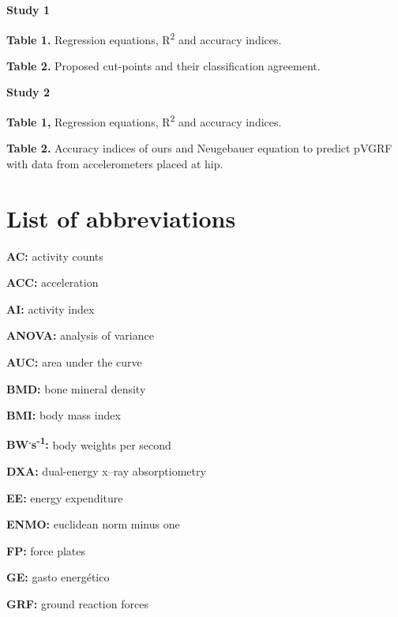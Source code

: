 \documentclass[12pt]{article}
\def\blankpage{%
      \clearpage%
      \thispagestyle{empty}%
      \addtocounter{page}{+0}%
      \null%
      \clearpage}
\begin{document}
\noindent \textbf{Study 1}
\vspace{0.5em}

\noindent \textbf{Table 1.} Regression equations, R\textsuperscript{2} and accuracy indices. 
\vspace{0.3em}

\noindent \textbf{Table 2.} Proposed cut-points and their classification agreement. 
\vspace{2em}

\noindent \textbf{Study 2}
\vspace{0.5em}

\noindent \textbf{Table 1,} Regression equations, R\textsuperscript{2} and accuracy indices. 
\vspace{0.3em}

\noindent \textbf{Table 2.} Accuracy indices of ours and Neugebauer equation to predict pVGRF with data from accelerometers placed at hip. 

\blankpage

\section*{\hfil List of abbreviations \hfil}
\vspace{0.5em}

\noindent \textbf{AC:} activity counts

\noindent \textbf{ACC:} acceleration

\noindent \textbf{AI:} activity index

\noindent \textbf{ANOVA:} analysis of variance

\noindent \textbf{AUC:} area under the curve

\noindent \textbf{BMD:} bone mineral density

\noindent \textbf{BMI:} body mass index

\noindent \textbf{BW\textsuperscript{.}s\textsuperscript{-1}:} body weights per second

\noindent \textbf{DXA:} dual-energy x–ray absorptiometry

\noindent \textbf{EE:} energy expenditure

\noindent \textbf{ENMO:} euclidean norm minus one

\noindent \textbf{FP:} force plates

\noindent \textbf{GE:} gasto energético

\noindent \textbf{GRF:} ground reaction forces
\end{document}

